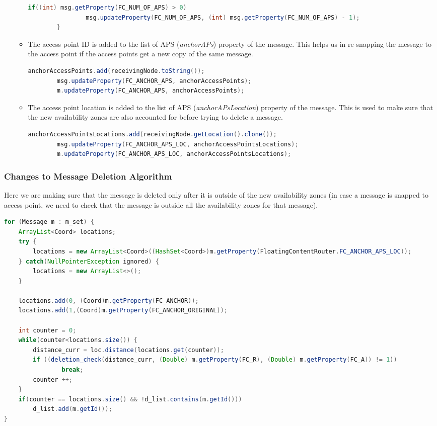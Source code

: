 \begin{itemize}
\begin{itemize}
\begin{lstlisting}[language=java]
			if((int) msg.getProperty(FC_NUM_OF_APS) > 0)
				msg.updateProperty(FC_NUM_OF_APS, (int) msg.getProperty(FC_NUM_OF_APS) - 1);
		}
		\end{lstlisting}
		\item The access point ID is added to the list of APS (\textit{anchorAPs}) property of the message. This helps us in re-snapping the message to the access point if the access points get a new copy of the same message.
		\begin{lstlisting}[language=java]
		anchorAccessPoints.add(receivingNode.toString());
		msg.updateProperty(FC_ANCHOR_APS, anchorAccessPoints);
		m.updateProperty(FC_ANCHOR_APS, anchorAccessPoints);
		\end{lstlisting}
		\item The access point location is added to the list of APS (\textit{anchorAPsLocation}) property of the message. This is used to make sure that the new availability zones are also accounted for before trying to delete a message.
		\begin{lstlisting}[language=java]
		anchorAccessPointsLocations.add(receivingNode.getLocation().clone());
		msg.updateProperty(FC_ANCHOR_APS_LOC, anchorAccessPointsLocations);
		m.updateProperty(FC_ANCHOR_APS_LOC, anchorAccessPointsLocations);
		\end{lstlisting}
	\end{itemize}
\end{itemize}
\subsubsection{Changes to Message Deletion Algorithm}
Here we are making sure that the message is deleted only after it is outside of the new availability zones (in case a message is snapped to access point, we need to check that the message is outside all the availability zones for that message).
\begin{lstlisting}[language=java]
for (Message m : m_set) {
	ArrayList<Coord> locations;
	try {
		locations = new ArrayList<Coord>((HashSet<Coord>)m.getProperty(FloatingContentRouter.FC_ANCHOR_APS_LOC));
	} catch(NullPointerException ignored) {
		locations = new ArrayList<>();
	}

	locations.add(0, (Coord)m.getProperty(FC_ANCHOR));
	locations.add(1,(Coord)m.getProperty(FC_ANCHOR_ORIGINAL));

	int counter = 0;
	while(counter<locations.size()) {
		distance_curr = loc.distance(locations.get(counter));
		if ((deletion_check(distance_curr, (Double) m.getProperty(FC_R), (Double) m.getProperty(FC_A)) != 1))
				break;
		counter ++;
	}
	if(counter == locations.size() && !d_list.contains(m.getId()))
		d_list.add(m.getId());
}
\end{lstlisting}
